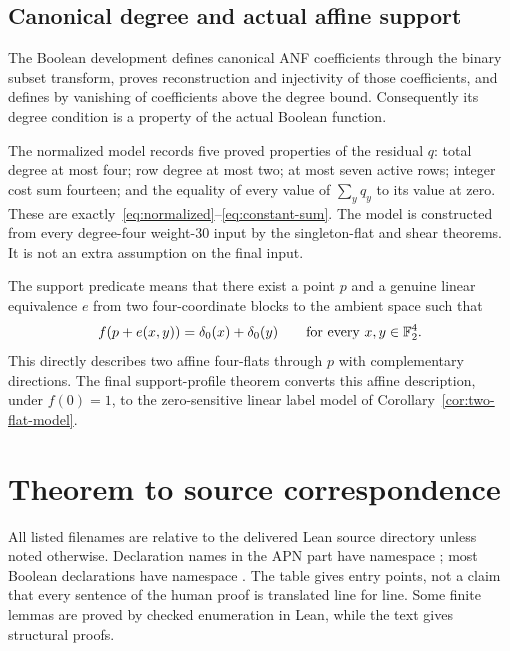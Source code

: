 \subsection{Canonical degree and actual affine support}
The Boolean development defines canonical ANF coefficients through the binary subset transform, proves reconstruction and injectivity of those coefficients, and defines  by vanishing of coefficients above the degree bound. Consequently its degree condition is a property of the actual Boolean function.

The normalized model  records five proved properties of the residual $q$: total degree at most four; row degree at most two; at most seven active rows; integer cost sum fourteen; and the equality of every value of $\sum_yq_y$ to its value at zero. These are exactly~\eqref{eq:normalized}--\eqref{eq:constant-sum}. The model is constructed from every degree-four weight-$30$ input by the singleton-flat and shear theorems. It is not an extra assumption on the final input.

The support predicate  means that there exist a point $p$ and a genuine linear equivalence $e$ from two four-coordinate blocks to the ambient space such that
\[
f(p+e(x,y))=\delta_0(x)+\delta_0(y)
\qquad\text{for every }x,y\in\mathbb F_2^4.
\]
This directly describes two affine four-flats through $p$ with complementary directions. The final support-profile theorem converts this affine description, under $f(0)=1$, to the zero-sensitive linear label model of Corollary~\ref{cor:two-flat-model}.

\section{Theorem to source correspondence}\label{app:map}
All listed filenames are relative to the delivered Lean source directory unless noted otherwise. Declaration names in the APN part have namespace ; most Boolean declarations have namespace . The table gives entry points, not a claim that every sentence of the human proof is translated line for line. Some finite lemmas are proved by checked enumeration in Lean, while the text gives structural proofs.

